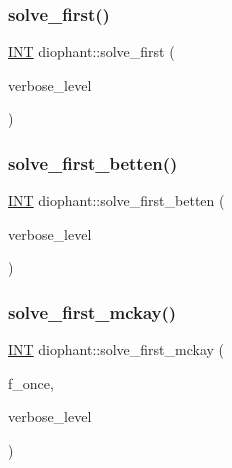\mbox{\label{classdiophant_accea09665d6f34e067c8f73452ca4ec0}} 
\subsubsection{\texorpdfstring{solve\+\_\+first()}{solve\_first()}}
{\footnotesize\ttfamily \mbox{\hyperlink{galois_8h_a09fddde158a3a20bd2dcadb609de11dc}{I\+NT}} diophant\+::solve\+\_\+first (\begin{DoxyParamCaption}\item[{\mbox{\hyperlink{galois_8h_a09fddde158a3a20bd2dcadb609de11dc}{I\+NT}}}]{verbose\+\_\+level }\end{DoxyParamCaption})}

\mbox{\label{classdiophant_a81a7f992acc7e822a7843bdc28fbe36e}} 
\subsubsection{\texorpdfstring{solve\+\_\+first\+\_\+betten()}{solve\_first\_betten()}}
{\footnotesize\ttfamily \mbox{\hyperlink{galois_8h_a09fddde158a3a20bd2dcadb609de11dc}{I\+NT}} diophant\+::solve\+\_\+first\+\_\+betten (\begin{DoxyParamCaption}\item[{\mbox{\hyperlink{galois_8h_a09fddde158a3a20bd2dcadb609de11dc}{I\+NT}}}]{verbose\+\_\+level }\end{DoxyParamCaption})}

\mbox{\label{classdiophant_ab4160d5e696a1f7b4180b06c2f0f9329}} 
\subsubsection{\texorpdfstring{solve\+\_\+first\+\_\+mckay()}{solve\_first\_mckay()}}
{\footnotesize\ttfamily \mbox{\hyperlink{galois_8h_a09fddde158a3a20bd2dcadb609de11dc}{I\+NT}} diophant\+::solve\+\_\+first\+\_\+mckay (\begin{DoxyParamCaption}\item[{\mbox{\hyperlink{galois_8h_a09fddde158a3a20bd2dcadb609de11dc}{I\+NT}}}]{f\+\_\+once,  }\item[{\mbox{\hyperlink{galois_8h_a09fddde158a3a20bd2dcadb609de11dc}{I\+NT}}}]{verbose\+\_\+level }\end{DoxyParamCaption})}

